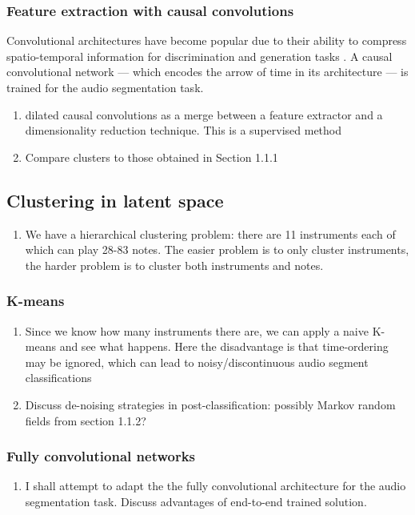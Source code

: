 \documentclass{article}[12pt]
\numberwithin{equation}{section}
\begin{document}
\subsubsection{Feature extraction with causal convolutions}
Convolutional architectures have become popular due to their ability to compress spatio-temporal
information for discrimination and generation tasks \cite{Oord2016a,Goodfellow}.
A causal convolutional network \cite{Oord2016} --- which encodes the arrow of time in
its architecture --- is trained for the audio segmentation task.
\begin{enumerate}
	\item dilated causal convolutions as a merge between a feature
	extractor and a dimensionality reduction technique. This is a supervised method
	\item Compare clusters to those obtained in Section 1.1.1
\end{enumerate}
\subsection{Clustering in latent space}
\begin{enumerate}
	\item We have a hierarchical clustering problem: there are 11 instruments each
	of which can play 28-83 notes. The easier problem is to only cluster instruments,
	the harder problem is to cluster both instruments and notes.
\end{enumerate}

\subsubsection{K-means}

\begin{enumerate}
	\item Since we know how many instruments there are, we can apply a naive K-means
	and see what happens. Here the disadvantage is that time-ordering may be
	ignored, which can lead to noisy/discontinuous audio segment classifications
	\item Discuss de-noising strategies in post-classification: possibly Markov
	random fields from section 1.1.2?
\end{enumerate}

\subsubsection{Fully convolutional networks}
\begin{enumerate}
	\item I shall attempt to adapt the the fully convolutional architecture \cite{Long2015}
	for the audio segmentation task. Discuss advantages of end-to-end trained solution.
\end{enumerate}
\end{document}
